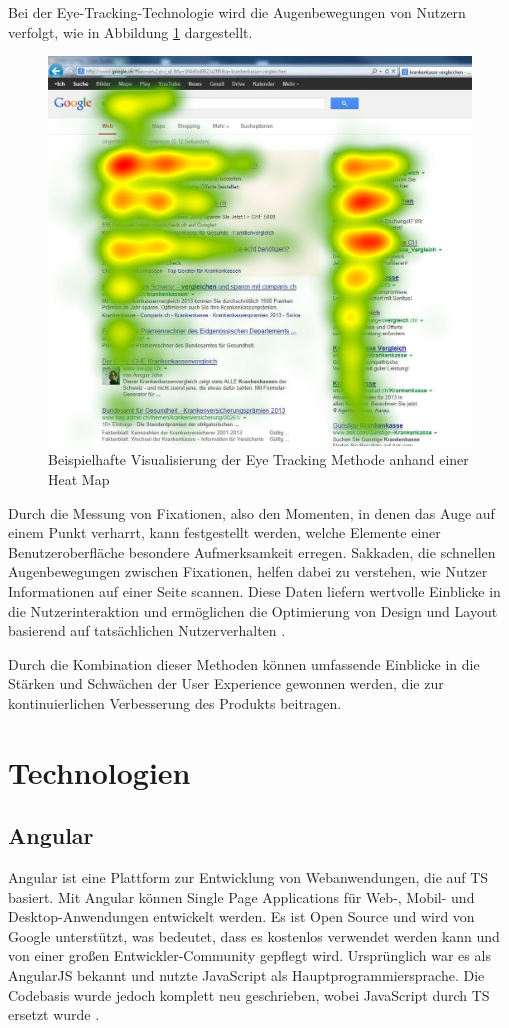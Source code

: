Bei der Eye-Tracking-Technologie wird die Augenbewegungen von Nutzern verfolgt, wie in Abbildung \ref{eye_tracking} dargestellt. 

\begin{figure}[h]
    \centering
    \includegraphics[clip,width=0.4\linewidth]{images/Eye-Tracking-Google-Search-Heat-Map.jpg}
    \caption[Beispielhafte Visualisierung der Eye Tracking Methode anhand einer Heat Map]{Beispielhafte Visualisierung der Eye Tracking Methode anhand einer Heat Map \cite{image_eye_tracking}}
    \label{eye_tracking}
\end{figure}

Durch die Messung von Fixationen, also den Momenten, in denen das Auge auf einem Punkt verharrt, kann festgestellt werden, welche Elemente einer Benutzeroberfläche besondere Aufmerksamkeit erregen. 
Sakkaden, die schnellen Augenbewegungen zwischen Fixationen, helfen dabei zu verstehen, wie Nutzer Informationen auf einer Seite scannen. 
Diese Daten liefern wertvolle Einblicke in die Nutzerinteraktion und ermöglichen die Optimierung von Design und Layout basierend auf tatsächlichen Nutzerverhalten \cite[S.3 ff.]{eye_tracking}.
  
Durch die Kombination dieser Methoden können umfassende Einblicke in die Stärken und Schwächen der User Experience gewonnen werden, die zur kontinuierlichen Verbesserung des Produkts beitragen.

\section{Technologien}
\subsection{Angular}
Angular ist eine Plattform zur Entwicklung von Webanwendungen, die auf \ac{TS} basiert. 
Mit Angular können Single Page Applications für Web-, Mobil- und Desktop-Anwendungen entwickelt werden. 
Es ist Open Source und wird von Google unterstützt, was bedeutet, dass es kostenlos verwendet werden kann und von einer großen Entwickler-Community gepflegt wird. 
Ursprünglich war es als AngularJS bekannt und nutzte JavaScript als Hauptprogrammiersprache. Die Codebasis wurde jedoch komplett neu geschrieben, wobei JavaScript durch TS ersetzt wurde \cite{angular_arch}.

